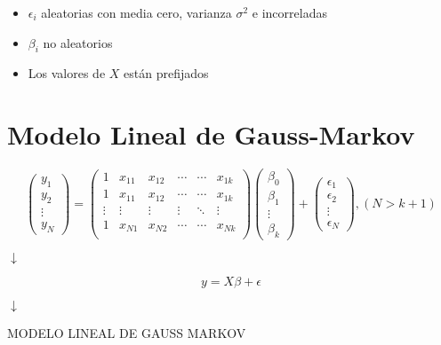 \documentclass[10pt,a4paper]{book}
\begin{document}
\begin{itemize}
\item $\epsilon_i$ aleatorias con media cero, varianza $\sigma^2$ e incorreladas
\item $\beta_i$ no aleatorios
\item Los valores de $X$ están prefijados
\end{itemize}

	\section{Modelo Lineal de Gauss-Markov}
$$ \left( \begin{array}{c}
y_1\\
y_2\\
\vdots\\
y_N \end{array} \right) = 
\left( \begin{array}{cccccc}
1 & x_{11} & x_{12} & \cdots & \cdots & x_{1k} \\
1 & x_{11} & x_{12} & \cdots & \cdots & x_{1k} \\
\vdots & \vdots & \vdots & \vdots & \ddots & \vdots \\
1 & x_{N1} & x_{N2} & \cdots & \cdots & x_{Nk} \\
\end{array} \right) 
\left( \begin{array}{c}
\beta_0\\
\beta_1\\
\vdots\\
\beta_k \end{array} \right) + 
\left( \begin{array}{c}
\epsilon_1\\
\epsilon_2\\
\vdots\\
\epsilon_N \end{array} \right),(N > k + 1)$$
\begin{center}
$ \downarrow $
\end{center}
$$y = X\beta + \epsilon$$
\begin{center}
$ \downarrow $
\end{center}
\begin{center}
MODELO LINEAL DE GAUSS MARKOV
\end{center}
\end{document}
